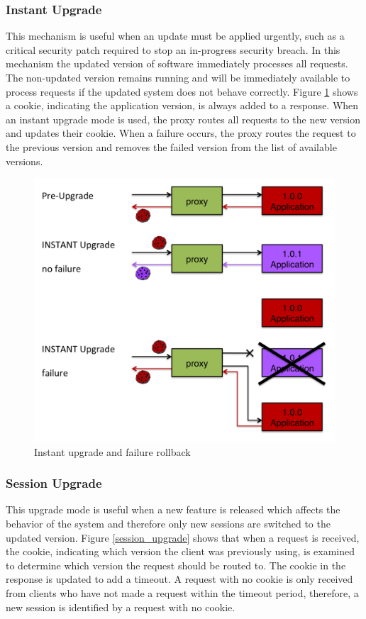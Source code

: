 \documentclass[a4paper,11pt,twoside]{report}
\begin{document}
\subsubsection*{Instant Upgrade} 
This mechanism is useful when an update must be applied urgently, such as a critical security patch required to stop an in-progress security breach.  In this mechanism the updated version of software immediately processes all requests. The non-updated version remains running and will be immediately available to process requests if the updated system does not behave correctly. Figure \ref{instant_upgrade} shows a cookie, indicating the application version, is always added to a response.  When an instant upgrade mode is used, the proxy routes all requests to the new version and updates their cookie.  When a failure occurs, the proxy routes the request to the previous version and removes the failed version from the list of available versions.
   
\begin{figure}[!ht]
  \centering
     \includegraphics[scale=0.30]{instant_upgrade}
  \caption{Instant upgrade and failure rollback}
  \label{instant_upgrade}
\end{figure}

\subsubsection*{Session Upgrade}
This upgrade mode is useful when a new feature is released which affects the behavior of the system and therefore only new sessions are switched to the updated version. Figure \ref{session_upgrade} shows that when a request is received, the cookie, indicating which version the client was previously using, is examined to determine which version the request should be routed to.  The cookie in the response is updated to add a timeout.  A request with no cookie is only received from clients who have not made a request within the timeout period, therefore, a new session is identified by a request with no cookie.
\end{document}
